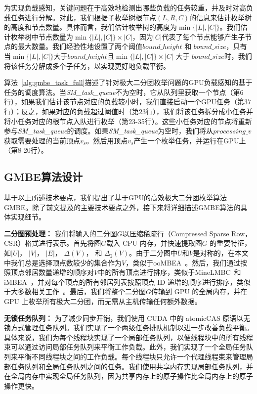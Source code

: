为实现负载感知，关键问题在于高效地检测出哪些负载的任务较重，并及时对高负载任务进行分解。对此，我们根据子枚举树根节点$(L,R,C)$的信息来估计枚举树的高度和节点数量。具体而言，我们估计枚举树的高度为$\min\{|L|,|C|\}$。我们估计枚举树中节点数量为$\min\{|L|,|C|\}\times|C|$，因为$|C|$代表了每个节点能够产生子节点的最大数量。我们经验性地设置了两个阈值$bound\_height$ 和 $bound\_size$，只有当$\min\{|L|,|C|\}$大于$bound\_height$且$\min\{|L|,|C|\}\times|C|$ 大于 $bound\_size$时，我们将该任务分解成多个子任务，以实现更好地负载平衡。

算法~\ref{alg:gmbe_task_full}描述了针对极大二分团枚举问题的GPU负载感知的基于任务的调度算法。当\textit{SM\_task\_queue}不为空时，它从队列里获取一个节点（第6行），如果我们估计该节点对应的负载较小时，我们直接启动一个GPU任务（第37行）；反之，如果对应的负载超过阈值时（第23行），我们将该任务拆分成小任务并将小任务对应的根节点入队进行枚举（第23-35行）。这些小任务对应的节点将重新参与\textit{SM\_task\_queue}的调度。如果\textit{SM\_task\_queue}为空时，我们将从$processing\_v$获取需要处理的当前顶点$v_s$。然后用顶点$v_s$产生一个枚举任务，并运行在GPU上（第8-20行）。



\subsection{GMBE算法设计}

基于以上所述技术要点，我们提出了基于GPU的高效极大二分团枚举算法GMBE。除了前文提及的主要技术要点之外，接下来将详细描述GMBE算法的具体实现细节。

\textbf{二分图预处理：} 我们将输入的二分图$G$以压缩稀疏行（Compressed Sparse Row，CSR）格式进行表示。首先将图$G$载入 CPU 内存，并快速提取图$G$ 的重要特征，如$|U|$， $|V|$， $|E|$， 
$\Delta(V)$， 和 $\Delta_2(V)$。由于二分图中$U$和$V$是对称的，在本文中我们总是选择顶点数较少的集合作为$V$，类似于ooMBEA~\cite{ooMBE22}。然后，我们通过按照顶点邻居数量递增的顺序对$V$中的所有顶点进行排序，类似于MineLMBC~\cite{minel06}和iMBEA~\cite{iMBEA14}，并对每个顶点的所有邻居列表按照顶点 ID 递增的顺序进行排序，类似于大多数相关工作~\cite{g2miner22,Kclique22}。最后，我们将整个二分图$G$传输到 GPU 的全局内存，并在 GPU 上枚举所有极大二分团，而无需从主机传输任何额外数据。

\textbf{无锁任务队列：} 为了减少同步开销，我们使用 CUDA 中的 \textsf{atomicCAS} 原语以无锁方式管理任务队列。我们实现了一个两级任务排队机制以进一步改善负载平衡。具体来说，我们为每个线程块实现了一个局部任务队列，以便线程块中的所有线程束可以通过访问局部任务队列来平衡工作负载。此外，我们实现了一个全局任务队列来平衡不同线程块之间的工作负载。每个线程块只允许一个代理线程束来管理局部任务队列和全局任务队列之间的任务。我们使用共享内存实现局部任务队列，并在全局内存中实现全局任务队列，因为共享内存上的原子操作比全局内存上的原子操作更快。

